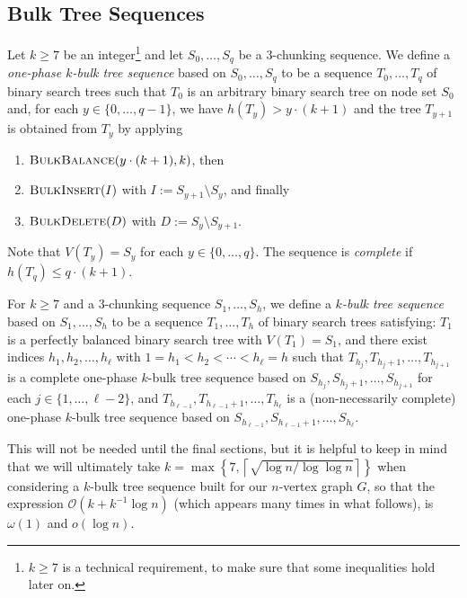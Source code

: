 \documentclass[kpfonts]{patmorin}
\newcommand{\Oh}{\mathcal{O}}
\let\ge\geqslant
\let\leq\leqslant
\let\geq\geqslant
\begin{document}
\subsection{Bulk Tree Sequences}



Let $k\ge 7$ be an integer\footnote{$k \geq 7$ is a technical requirement, to make sure that some inequalities hold later on.} and let $S_0,\ldots,S_q$ be a $3$-chunking sequence.
We define a \emph{one-phase $k$-bulk tree sequence} based on $S_0,\ldots,S_q$ to be a sequence $T_0, \dots, T_{q}$ of binary search trees such that $T_0$ is an arbitrary binary search tree on node set $S_0$ and,  for each $y\in \{0, \dots, q-1\}$, we have $h(T_y)>y\cdot(k+1)$ and
the tree $T_{y+1}$ is obtained from $T_y$ by applying
\begin{enumerate}[label={(\roman*)}, ref={\roman*}, noitemsep]
    \item $\textsc{BulkBalance}(y\cdot(k+1),k)$, then
    \item $\textsc{BulkInsert}(I)$ with $I:=S_{y+1} \setminus S_{y}$, and finally
    \item $\textsc{BulkDelete}(D)$ with $D:=S_{y} \setminus S_{y+1}$.
\end{enumerate}
Note that $V(T_y)=S_y$ for each $y \in \{0, \dots, q\}$.
The sequence is \emph{complete} if $h(T_q)\leq q\cdot(k+1)$.

For $k\geq 7$ and a $3$-chunking sequence $S_1,\ldots,S_h$, we define
a \emph{$k$-bulk tree sequence} based on $S_1,\ldots,S_h$ to be a sequence $T_1, \dots, T_h$ of binary search trees satisfying:
$T_1$ is a perfectly balanced binary search tree with $V(T_1)=S_1$, and
there exist indices $h_1,h_2,\ldots,h_{\ell}$ with $1=h_1 < h_2 < \cdots <h_{\ell} = h$  such that $T_{h_j}, T_{h_j+1},\ldots,T_{h_{j+1}}$ is a complete one-phase $k$-bulk tree sequence based on $S_{h_j}, S_{h_j+1},\ldots,S_{h_{j+1}}$
for each $j\in\{1,\ldots,\ell-2\}$, and $T_{h_{\ell-1}}, T_{h_{\ell-1}+1},\ldots,T_{h_{\ell}}$ is a (non-necessarily complete) one-phase $k$-bulk tree sequence based on $S_{h_{\ell-1}},S_{h_{\ell-1}+1},\ldots,S_{h_{\ell}}$.


This will not be needed until the final sections, but it is helpful to keep in mind that we will ultimately take $k=\max\left\{7,\left\lceil\sqrt{\log n / \log\log n}\right\rceil\right\}$ when considering a $k$-bulk tree sequence built for our $n$-vertex graph $G$, so that the expression $\Oh(k+k^{-1}\log n)$ (which appears many times in what follows), is $\omega(1)$ and $o(\log n)$.
\end{document}
